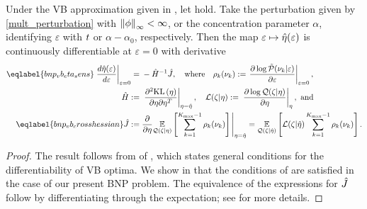 \begin{thm}
%
Under the VB approximation given in , let 
hold.  Take the perturbation given by \eqref{mult_perturbation} with
$\left\Vert\phi\right\Vert_{\infty} < \infty$, or the concentration parameter $\alpha$, identifying
$\varepsilon$ with $t$ or $\alpha - \alpha_0$, respectively.  Then the map
$\varepsilon \mapsto \hat\eta(\varepsilon)$ is continuously differentiable at
$\varepsilon = 0$ with derivative
%
\begin{align}
%
\eqlabel{bnp_vb_eta_sens}
\fracat{d \etaopt(\varepsilon)}{d \varepsilon}{\varepsilon=0} ={}&
    - \hessopt^{-1} \crosshessian, \mathwhere
    \rho_\k(\nuk) := \fracat{\partial \log \ptil(\nu_k \vert \varepsilon)}
            {\partial \varepsilon}{\varepsilon=0}
            ,
\\
%
\hessopt :={}& \fracat{\partial^2 \KL{\eta}}
                      {\partial \eta \partial \eta^T}
                      {\eta = \etaopt},
\quad \lqgradbar{\zeta \vert \eta} :={}
\fracat{\partial \log \q(\zeta \vert \eta)}{\partial \eta}{\eta}, \textrm{ and}\\
%
\eqlabel{bnp_vb_crosshessian}
\crosshessian :={}&
    \frac{\partial}{\partial\eta}
    \expect{\q(\zeta \vert \eta)}{
        \sum_{k=1}^{\kmax-1}
        \rho_\k(\nuk)
    }
    \Bigg|_{\eta = \etaopt}
={}
    \expect{\q(\zeta \vert \etaopt)}{
          \lqgradbar{\zeta \vert \etaopt}
          \sum_{k=1}^{\kmax-1}
          \rho_\k(\nuk)}.
%
\end{align}
%
\end{thm}
%
\begin{proof}
%
The result follows from  of ,
which states general conditions for the differentiability of VB optima.  We show
in  that the conditions
of  are satisfied in the case of our present BNP problem. The
equivalence of the expressions for $\hat J$ follow by differentiating
through the expectation; see  for more details.
%
\end{proof}
%

